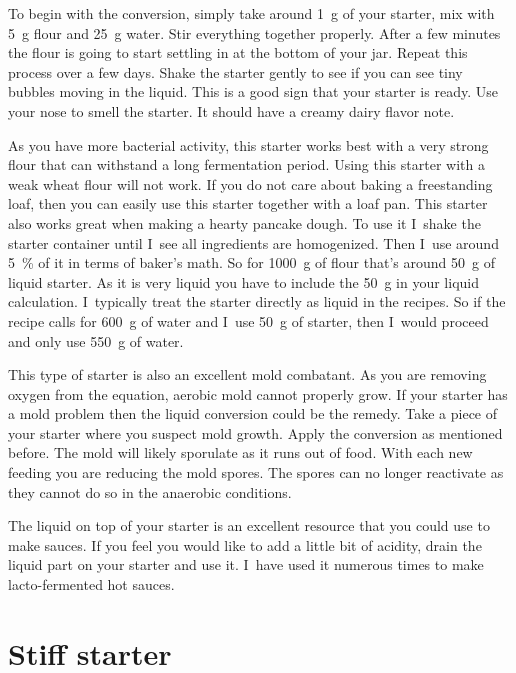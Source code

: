To begin with the
conversion, simply take around \qty{1}{\gram} of your starter, mix with \qty{5}{\gram} flour and
\qty{25}{\gram} water. Stir everything together properly. After a few minutes the flour is
going to start settling in at the bottom of your jar. Repeat this process over
a few days. Shake the starter gently to see if you can see tiny  bubbles
moving in the liquid. This is a good sign that your starter is ready. Use your
nose to smell the starter. It should have a creamy dairy flavor note.

As you have more bacterial activity, this starter works best with a very strong
flour that can withstand a long fermentation period. Using this starter with a
weak wheat flour will not work. If you do not care about baking a freestanding loaf,
then you can easily use this starter together with a loaf pan.
This starter also works great when making a hearty pancake dough. To use it
I~shake the starter container until I~see all ingredients are homogenized.  Then
I~use around \qty{5}{\percent} of it in terms of baker's math. So for \qty{1000}{\gram} of flour
that's around \qty{50}{\gram} of liquid starter. As it is very liquid you have to
include the \qty{50}{\gram} in your liquid calculation. I~typically treat the starter
directly as liquid in the recipes. So if the recipe calls for \qty{600}{\gram} of water
and I~use \qty{50}{\gram} of starter, then I~would proceed and only use \qty{550}{\gram} of
water.

This type of starter is also an excellent mold combatant. As you are removing
oxygen from the equation, aerobic mold cannot properly grow. If your starter
has a mold problem then the liquid conversion could be the remedy. Take a
piece of your starter where you suspect mold growth. Apply the conversion
as mentioned before. The mold will likely sporulate as it runs out of food.
With each new feeding you are reducing the mold spores. The spores can no
longer reactivate as they cannot do so in the anaerobic conditions.

The liquid on top of your starter is an excellent resource that you could use
to make sauces. If you feel you would like to add a little bit of acidity,
drain the liquid part on your starter and use it. I~have used it numerous
times to make lacto-fermented hot sauces.

\section{Stiff starter}%
\label{sec:stiff-starter}

